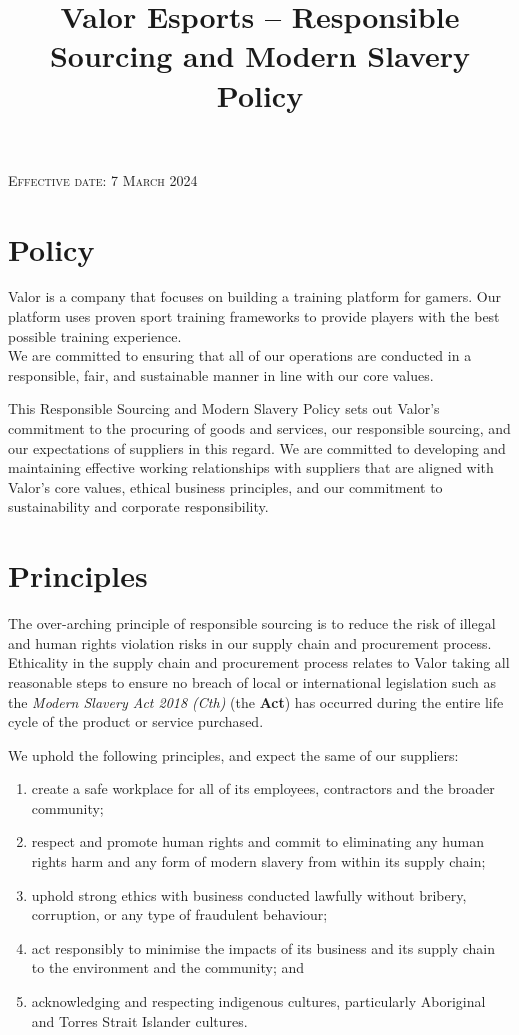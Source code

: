 \documentclass[10pt]{article}
\begin{document}
\title{Valor Esports -- Responsible Sourcing and Modern Slavery Policy}

\textsc{Effective date: 7 March 2024} \\


\section{Policy}
\label{policy}
Valor is a company that focuses on building a training platform for gamers. Our platform uses proven sport training frameworks to provide players with the best possible training experience. \\

We are committed to ensuring that all of our operations are conducted in a responsible, fair, and sustainable manner in line with our core values.

This Responsible Sourcing and Modern Slavery Policy sets out Valor's commitment to the procuring of goods and services, our responsible sourcing, and our expectations of suppliers in this regard. We are committed to developing and maintaining effective working relationships with suppliers that are aligned with Valor's core values, ethical business principles, and our commitment to sustainability and corporate responsibility.


\section{Principles}
\label{principles}
The over-arching principle of responsible sourcing is to reduce the risk of illegal and human rights violation risks in our supply chain and procurement process. Ethicality in the supply chain and procurement process relates to Valor taking all reasonable steps to ensure no breach of local or international legislation such as the \textit{Modern Slavery Act 2018 (Cth)} (the \textbf{Act}) has occurred during the entire life cycle of the product or service purchased.

We uphold the following principles, and expect the same of our suppliers:
\begin{enumerate}[(1)]
	\item create a safe workplace for all of its employees, contractors and the broader community;
	\item respect and promote human rights and commit to eliminating any human rights harm and any form of modern slavery from within its supply chain;
	\item uphold strong ethics with business conducted lawfully without bribery, corruption, or any type of fraudulent behaviour;
	\item act responsibly to minimise the impacts of its business and its supply chain to the environment and the community; and
	\item acknowledging and respecting indigenous cultures, particularly Aboriginal and Torres Strait Islander cultures.
\end{enumerate}
\end{document}
